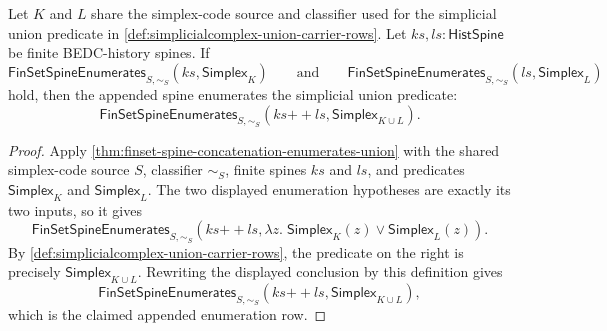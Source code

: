 \begin{theorem}
\label{thm:simplicialcomplex-union-append-enumeration}
Let $K$ and $L$ share the simplex-code source and classifier used for the simplicial union predicate in \autoref{def:simplicialcomplex-union-carrier-rows}. Let $ks,ls:\mathsf{HistSpine}$ be finite BEDC-history spines. If
$$
\mathsf{FinSetSpineEnumerates}_{S,\sim_S}(ks,\mathsf{Simplex}_K)
\qquad\text{and}\qquad
\mathsf{FinSetSpineEnumerates}_{S,\sim_S}(ls,\mathsf{Simplex}_L)
$$
hold, then the appended spine enumerates the simplicial union predicate:
$$
\mathsf{FinSetSpineEnumerates}_{S,\sim_S}(ks{++}ls,\mathsf{Simplex}_{K\cup L}).
$$
\end{theorem}
\begin{proof}
Apply \autoref{thm:finset-spine-concatenation-enumerates-union} with the shared simplex-code source $S$, classifier $\sim_S$, finite spines $ks$ and $ls$, and predicates $\mathsf{Simplex}_K$ and $\mathsf{Simplex}_L$. The two displayed enumeration hypotheses are exactly its two inputs, so it gives
$$
\mathsf{FinSetSpineEnumerates}_{S,\sim_S}
(ks{++}ls,\lambda z.\;\mathsf{Simplex}_K(z)\vee\mathsf{Simplex}_L(z)).
$$
By \autoref{def:simplicialcomplex-union-carrier-rows}, the predicate on the right is precisely $\mathsf{Simplex}_{K\cup L}$. Rewriting the displayed conclusion by this definition gives
$$
\mathsf{FinSetSpineEnumerates}_{S,\sim_S}(ks{++}ls,\mathsf{Simplex}_{K\cup L}),
$$
which is the claimed appended enumeration row.
\end{proof}

